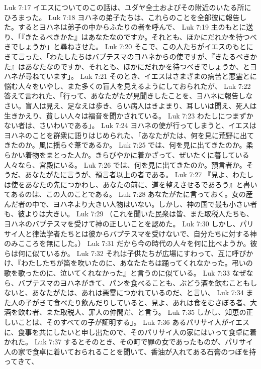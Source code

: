 Luk 7:17  イエスについてのこの話は、ユダヤ全土およびその附近のいたる所にひろまった。
Luk 7:18  ヨハネの弟子たちは、これらのことを全部彼に報告した。するとヨハネは弟子の中からふたりの者を呼んで、
Luk 7:19  主のもとに送り、「『きたるべきかた』はあなたなのですか。それとも、ほかにだれかを待つべきでしょうか」と尋ねさせた。
Luk 7:20  そこで、この人たちがイエスのもとにきて言った、「わたしたちはバプテスマのヨハネからの使ですが、『きたるべきかた』はあなたなのですか、それとも、ほかにだれかを待つべきでしょうか、とヨハネが尋ねています」。
Luk 7:21  そのとき、イエスはさまざまの病苦と悪霊とに悩む人々をいやし、また多くの盲人を見えるようにしておられたが、
Luk 7:22  答えて言われた、「行って、あなたがたが見聞きしたことを、ヨハネに報告しなさい。盲人は見え、足なえは歩き、らい病人はきよまり、耳しいは聞え、死人は生きかえり、貧しい人々は福音を聞かされている。
Luk 7:23  わたしにつまずかない者は、さいわいである」。
Luk 7:24  ヨハネの使が行ってしまうと、イエスはヨハネのことを群衆に語りはじめられた、「あなたがたは、何を見に荒野に出てきたのか。風に揺らぐ葦であるか。
Luk 7:25  では、何を見に出てきたのか。柔らかい着物をまとった人か。きらびやかに着かざって、ぜいたくに暮している人々なら、宮殿にいる。
Luk 7:26  では、何を見に出てきたのか。預言者か。そうだ、あなたがたに言うが、預言者以上の者である。
Luk 7:27  『見よ、わたしは使をあなたの先につかわし、あなたの前に、道を整えさせるであろう』と書いてあるのは、この人のことである。
Luk 7:28  あなたがたに言っておく。女の産んだ者の中で、ヨハネより大きい人物はいない。しかし、神の国で最も小さい者も、彼よりは大きい。
Luk 7:29  （これを聞いた民衆は皆、また取税人たちも、ヨハネのバプテスマを受けて神の正しいことを認めた。
Luk 7:30  しかし、パリサイ人と律法学者たちとは彼からバプテスマを受けないで、自分たちに対する神のみこころを無にした。）
Luk 7:31  だから今の時代の人々を何に比べようか。彼らは何に似ているか。
Luk 7:32  それは子供たちが広場にすわって、互に呼びかけ、『わたしたちが笛を吹いたのに、あなたたちは踊ってくれなかった。弔いの歌を歌ったのに、泣いてくれなかった』と言うのに似ている。
Luk 7:33  なぜなら、バプテスマのヨハネがきて、パンを食べることも、ぶどう酒を飲むこともしないと、あなたがたは、あれは悪霊につかれているのだ、と言い、
Luk 7:34  また人の子がきて食べたり飲んだりしていると、見よ、あれは食をむさぼる者、大酒を飲む者、また取税人、罪人の仲間だ、と言う。
Luk 7:35  しかし、知恵の正しいことは、そのすべての子が証明する」。
Luk 7:36  あるパリサイ人がイエスに、食事を共にしたいと申し出たので、そのパリサイ人の家にはいって食卓に着かれた。
Luk 7:37  するとそのとき、その町で罪の女であったものが、パリサイ人の家で食卓に着いておられることを聞いて、香油が入れてある石膏のつぼを持ってきて、
